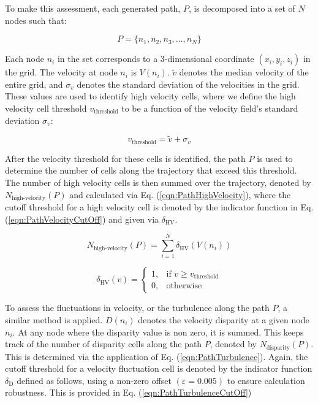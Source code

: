 \documentclass[final,5p,times,twocolumn]{elsarticle}
\begin{document}
To make this assessment, each generated path, $P$, is decomposed into a set of $N$ nodes such that:

\begin{equation}
    \label{eqn:PathDecomp}
   P = \{ n_1, n_2, n_3, \dots, n_N \} 
\end{equation}

Each node $n_i$ in the set corresponds to a 3-dimensional coordinate $(x_i, y_i, z_i)$ in the grid. The velocity at node $n_i$ is $V(n_i)$. $\tilde{v}$ denotes the median velocity of the entire grid, and $\sigma_v$ denotes the standard deviation of the velocities in the grid. These values are used to identify high velocity cells, where we define the high velocity cell threshold $v_{\text{threshold}}$ to be a function of the velocity field's standard deviation $\sigma_v$:

\begin{equation}
    v_{\text{threshold}} = \tilde{v} + \sigma_v
\end{equation}

After the velocity threshold for these cells is identified, the path $P$ is used to determine the number of cells along the trajectory that exceed this threshold. The number of high velocity cells is then summed over the trajectory, denoted by $N_{\text{high-velocity}}(P)$ and calculated via Eq. (\ref{eqn:PathHighVelocity}), where the cutoff threshold for a high velocity cell is denoted by the indicator function in Eq. (\ref{eqn:PathVelocityCutOff}) and given via $\delta_{\text{HV}}$.

\begin{equation}
\label{eqn:PathHighVelocity}
    N_{\text{high-velocity}}(P) = \sum_{i=1}^{N} \delta_{\text{HV}}(V(n_i))   
\end{equation}

\begin{equation}
\label{eqn:PathVelocityCutOff}
    \delta_{\text{HV}}(v) =
    \begin{cases}
    1, & \text{if } v \geq v_{\text{threshold}} \\
    0, & \text{otherwise}
    \end{cases}
\end{equation}

To assess the fluctuations in velocity, or the turbulence along the path $P$, a similar method is applied. $D(n_i)$ denotes the velocity disparity at a given node $n_i$. At any node where the disparity value is non zero, it is summed. This keeps track of the number of disparity cells along the path $P$, denoted by $N_{\text{disparity}}(P)$. This is determined via the application of Eq. (\ref{eqn:PathTurbulence}). Again, the cutoff threshold for a velocity fluctuation cell is denoted by the indicator function $\delta_{\text{D}}$ defined as follows, using a non-zero offset $(\varepsilon = 0.005)$ to ensure calculation robustness. This is provided in Eq. (\ref{eqn:PathTurbulenceCutOff})
\end{document}
